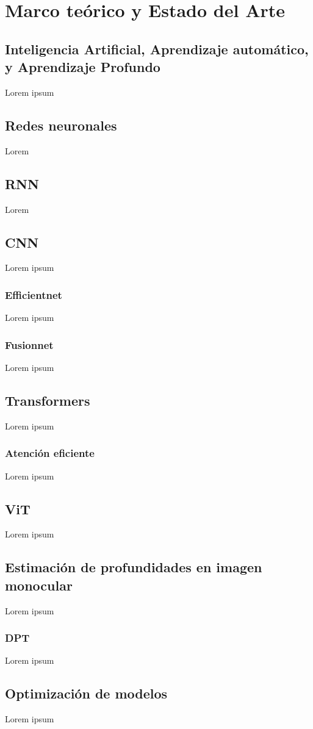 \section{Marco teórico y Estado del Arte}

\subsection{Inteligencia Artificial, Aprendizaje automático, y Aprendizaje Profundo}
Lorem ipsum

\subsection{Redes neuronales}
Lorem

\subsection{RNN}
Lorem

\subsection{CNN}
Lorem ipsum

\subsubsection{Efficientnet}
Lorem ipsum

\subsubsection{Fusionnet}
Lorem ipsum

\subsection{Transformers}
Lorem ipsum

\subsubsection{Atención eficiente}
Lorem ipsum

\subsection{ViT}
Lorem ipsum

\subsection{Estimación de profundidades en imagen monocular}
Lorem ipsum

\subsubsection{DPT}
Lorem ipsum

\subsection{Optimización de modelos}
Lorem ipsum

\clearpage